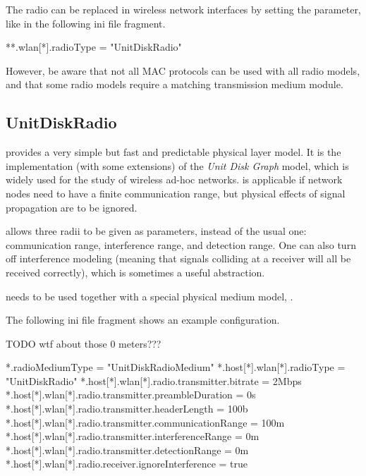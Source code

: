The radio can be replaced in wireless network interfaces by setting the
 parameter, like in the following ini file fragment.

\begin{inifile}
**.wlan[*].radioType = "UnitDiskRadio"
\end{inifile}

However, be aware that not all MAC protocols can be used with all radio models,
and that some radio models require a matching transmission medium module.

\subsection{UnitDiskRadio}
\label{sec:phy:unitdiskradio}

 provides a very simple but fast and predictable
physical layer model. It is the implementation (with some extensions)
of the \textit{Unit Disk Graph} model, which is widely used
for the study of wireless ad-hoc networks.
 is applicable if network nodes need
to have a finite communication range, but physical effects
of signal propagation are to be ignored.

 allows three radii to be given as parameters,
instead of the usual one: communication range, interference range, and
detection range. One can also turn off interference modeling
(meaning that signals colliding at a receiver will all be received
correctly), which is sometimes a useful abstraction.

 needs to be used together with a special physical
medium model, .

The following ini file fragment shows an example configuration.

TODO wtf about those 0 meters???

\begin{inifile}
*.radioMediumType = "UnitDiskRadioMedium"
*.host[*].wlan[*].radioType = "UnitDiskRadio"
*.host[*].wlan[*].radio.transmitter.bitrate = 2Mbps
*.host[*].wlan[*].radio.transmitter.preambleDuration = 0s
*.host[*].wlan[*].radio.transmitter.headerLength = 100b
*.host[*].wlan[*].radio.transmitter.communicationRange = 100m
*.host[*].wlan[*].radio.transmitter.interferenceRange = 0m
*.host[*].wlan[*].radio.transmitter.detectionRange = 0m
*.host[*].wlan[*].radio.receiver.ignoreInterference = true
\end{inifile}

